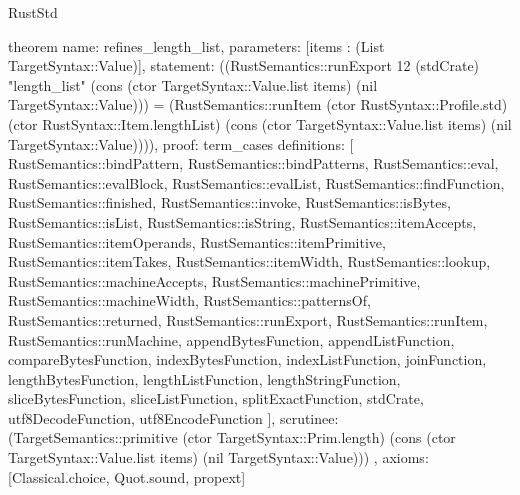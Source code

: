 \begin{lexlean}{RustStd}
\begin{semanticmodule}
theorem{
  name: refines_length_list,
  parameters: [items : (List TargetSyntax::Value)],
  statement: ((RustSemantics::runExport 12 (stdCrate) "length_list" (cons (ctor TargetSyntax::Value.list items) (nil TargetSyntax::Value))) = (RustSemantics::runItem (ctor RustSyntax::Profile.std) (ctor RustSyntax::Item.lengthList) (cons (ctor TargetSyntax::Value.list items) (nil TargetSyntax::Value)))),
  proof: term_cases{
    definitions: [
      RustSemantics::bindPattern,
      RustSemantics::bindPatterns,
      RustSemantics::eval,
      RustSemantics::evalBlock,
      RustSemantics::evalList,
      RustSemantics::findFunction,
      RustSemantics::finished,
      RustSemantics::invoke,
      RustSemantics::isBytes,
      RustSemantics::isList,
      RustSemantics::isString,
      RustSemantics::itemAccepts,
      RustSemantics::itemOperands,
      RustSemantics::itemPrimitive,
      RustSemantics::itemTakes,
      RustSemantics::itemWidth,
      RustSemantics::lookup,
      RustSemantics::machineAccepts,
      RustSemantics::machinePrimitive,
      RustSemantics::machineWidth,
      RustSemantics::patternsOf,
      RustSemantics::returned,
      RustSemantics::runExport,
      RustSemantics::runItem,
      RustSemantics::runMachine,
      appendBytesFunction,
      appendListFunction,
      compareBytesFunction,
      indexBytesFunction,
      indexListFunction,
      joinFunction,
      lengthBytesFunction,
      lengthListFunction,
      lengthStringFunction,
      sliceBytesFunction,
      sliceListFunction,
      splitExactFunction,
      stdCrate,
      utf8DecodeFunction,
      utf8EncodeFunction
    ],
    scrutinee: (TargetSemantics::primitive (ctor TargetSyntax::Prim.length) (cons (ctor TargetSyntax::Value.list items) (nil TargetSyntax::Value)))
  },
  axioms: [Classical.choice, Quot.sound, propext]
}


\end{semanticmodule}
\end{lexlean}
